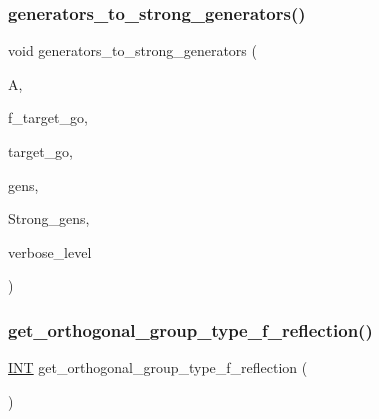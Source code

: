 \subsubsection{\texorpdfstring{generators\+\_\+to\+\_\+strong\+\_\+generators()}{generators\_to\_strong\_generators()}}
{\footnotesize\ttfamily void generators\+\_\+to\+\_\+strong\+\_\+generators (\begin{DoxyParamCaption}\item[{\mbox{\hyperlink{classaction}{action}} $\ast$}]{A,  }\item[{\mbox{\hyperlink{galois_8h_a09fddde158a3a20bd2dcadb609de11dc}{I\+NT}}}]{f\+\_\+target\+\_\+go,  }\item[{\mbox{\hyperlink{classlonginteger__object}{longinteger\+\_\+object}} \&}]{target\+\_\+go,  }\item[{\mbox{\hyperlink{classvector__ge}{vector\+\_\+ge}} $\ast$}]{gens,  }\item[{\mbox{\hyperlink{classstrong__generators}{strong\+\_\+generators}} $\ast$\&}]{Strong\+\_\+gens,  }\item[{\mbox{\hyperlink{galois_8h_a09fddde158a3a20bd2dcadb609de11dc}{I\+NT}}}]{verbose\+\_\+level }\end{DoxyParamCaption})}

\mbox{\label{action__global_8_c_a50f15f51a8bbf773e6d3b3ac3ddbf861}} 
\subsubsection{\texorpdfstring{get\+\_\+orthogonal\+\_\+group\+\_\+type\+\_\+f\+\_\+reflection()}{get\_orthogonal\_group\_type\_f\_reflection()}}
{\footnotesize\ttfamily \mbox{\hyperlink{galois_8h_a09fddde158a3a20bd2dcadb609de11dc}{I\+NT}} get\+\_\+orthogonal\+\_\+group\+\_\+type\+\_\+f\+\_\+reflection (\begin{DoxyParamCaption}{ }\end{DoxyParamCaption})}

\mbox{\label{action__global_8_c_a7afb8c47b30d0033c84e08329a72083c}} 
